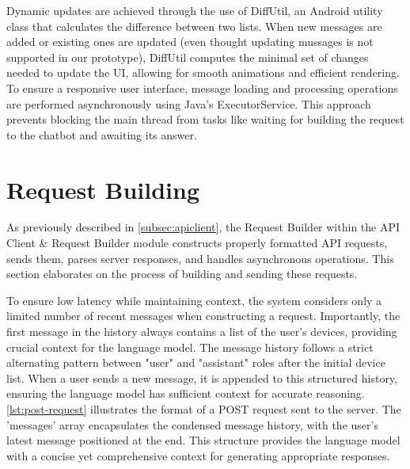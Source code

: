 Dynamic updates are achieved through the use of DiffUtil, an Android utility class that calculates the difference between two lists. When new messages are added or existing ones are updated (even thought updating mussages is not supported in our prototype), DiffUtil computes the minimal set of changes needed to update the UI, allowing for smooth animations and efficient rendering.
To ensure a responsive user interface, message loading and processing operations are performed asynchronously using Java's ExecutorService. This approach prevents blocking the main thread from tasks like waiting for building the request to the chatbot and awaiting its answer.


\section{Request Building}
\label{sec:req-building}
As previously described in \cref{subsec:apiclient}, the Request Builder within the API Client \& Request Builder module constructs properly formatted API requests, sends them, parses server responses, and handles asynchronous operations.
This section elaborates on the process of building and sending these requests.

To ensure low latency while maintaining context, the system considers only a limited number of recent messages when constructing a request. Importantly, the first message in the history always contains a list of the user's devices, providing crucial context for the language model.
The message history follows a strict alternating pattern between "user" and "assistant" roles after the initial device list. When a user sends a new message, it is appended to this structured history, ensuring the language model has sufficient context for accurate reasoning.
\cref{lst:post-request} illustrates the format of a POST request sent to the server. The 'messages' array encapsulates the condensed message history, with the user's latest message positioned at the end. This structure provides the language model with a concise yet comprehensive context for generating appropriate responses.

